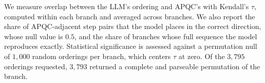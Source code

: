 We measure overlap between the LLM's ordering and APQC's with Kendall's $\tau$, computed within each branch and averaged across branches.
We also report the share of APQC-adjacent step pairs that the model places in the correct direction, whose null value is $0.5$, and the share of branches whose full sequence the model reproduces exactly.
Statistical significance is assessed against a permutation null of $1{,}000$ random orderings per branch, which centers $\tau$ at zero.
Of the $3{,}795$ orderings requested, $3{,}793$ returned a complete and parseable permutation of the branch.%

